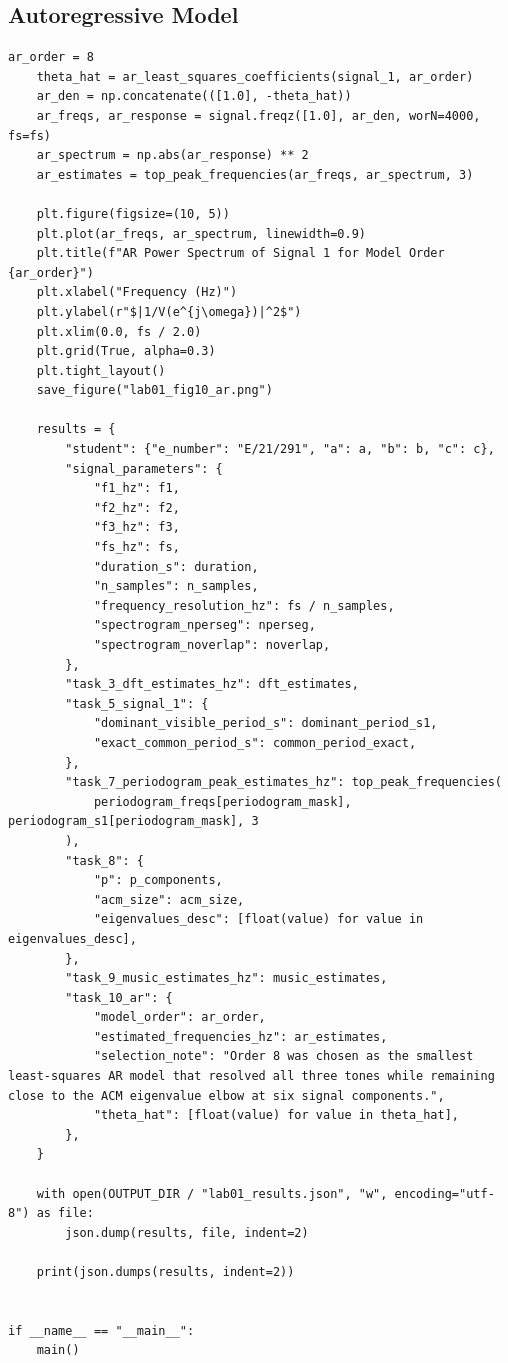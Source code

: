 \documentclass[12pt, a4paper]{article}
\begin{document}
\subsection{Autoregressive Model}
\begin{lstlisting}[caption={Least-squares AR model, AR spectrum, and result export for Lab 01.}, label={lst:lab01_ar}]
    ar_order = 8
    theta_hat = ar_least_squares_coefficients(signal_1, ar_order)
    ar_den = np.concatenate(([1.0], -theta_hat))
    ar_freqs, ar_response = signal.freqz([1.0], ar_den, worN=4000, fs=fs)
    ar_spectrum = np.abs(ar_response) ** 2
    ar_estimates = top_peak_frequencies(ar_freqs, ar_spectrum, 3)

    plt.figure(figsize=(10, 5))
    plt.plot(ar_freqs, ar_spectrum, linewidth=0.9)
    plt.title(f"AR Power Spectrum of Signal 1 for Model Order {ar_order}")
    plt.xlabel("Frequency (Hz)")
    plt.ylabel(r"$|1/V(e^{j\omega})|^2$")
    plt.xlim(0.0, fs / 2.0)
    plt.grid(True, alpha=0.3)
    plt.tight_layout()
    save_figure("lab01_fig10_ar.png")

    results = {
        "student": {"e_number": "E/21/291", "a": a, "b": b, "c": c},
        "signal_parameters": {
            "f1_hz": f1,
            "f2_hz": f2,
            "f3_hz": f3,
            "fs_hz": fs,
            "duration_s": duration,
            "n_samples": n_samples,
            "frequency_resolution_hz": fs / n_samples,
            "spectrogram_nperseg": nperseg,
            "spectrogram_noverlap": noverlap,
        },
        "task_3_dft_estimates_hz": dft_estimates,
        "task_5_signal_1": {
            "dominant_visible_period_s": dominant_period_s1,
            "exact_common_period_s": common_period_exact,
        },
        "task_7_periodogram_peak_estimates_hz": top_peak_frequencies(
            periodogram_freqs[periodogram_mask], periodogram_s1[periodogram_mask], 3
        ),
        "task_8": {
            "p": p_components,
            "acm_size": acm_size,
            "eigenvalues_desc": [float(value) for value in eigenvalues_desc],
        },
        "task_9_music_estimates_hz": music_estimates,
        "task_10_ar": {
            "model_order": ar_order,
            "estimated_frequencies_hz": ar_estimates,
            "selection_note": "Order 8 was chosen as the smallest least-squares AR model that resolved all three tones while remaining close to the ACM eigenvalue elbow at six signal components.",
            "theta_hat": [float(value) for value in theta_hat],
        },
    }

    with open(OUTPUT_DIR / "lab01_results.json", "w", encoding="utf-8") as file:
        json.dump(results, file, indent=2)

    print(json.dumps(results, indent=2))


if __name__ == "__main__":
    main()
\end{lstlisting}
\end{document}
